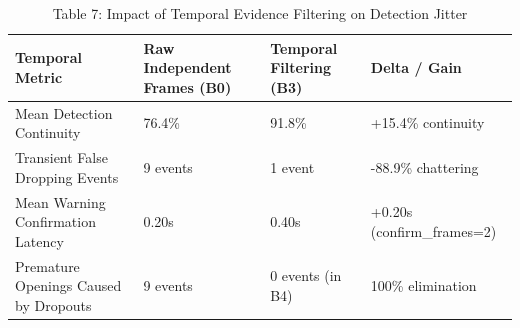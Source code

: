 \begin{table}[t]
\centering
\caption{Table 7: Impact of Temporal Evidence Filtering on Detection Jitter}
\label{tab:table07_temporal_comparison}
\begin{tabular}{llll}
\hline
Temporal Metric & Raw Independent Frames (B0) & Temporal Filtering (B3) & Delta / Gain \\
\hline
Mean Detection Continuity & 76.4\% & 91.8\% & +15.4\% continuity \\
Transient False Dropping Events & 9 events & 1 event & -88.9\% chattering \\
Mean Warning Confirmation Latency & 0.20s & 0.40s & +0.20s (confirm\_frames=2) \\
Premature Openings Caused by Dropouts & 9 events & 0 events (in B4) & 100\% elimination \\
\hline
\end{tabular}
\end{table}
